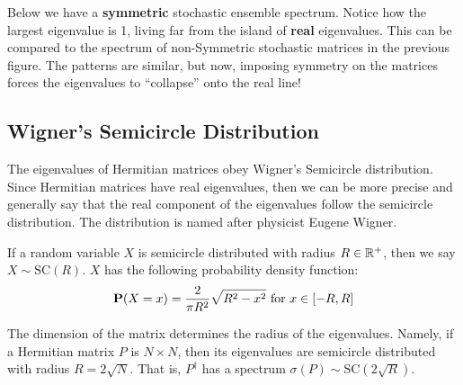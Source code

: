 Below we have a \textbf{symmetric} stochastic ensemble spectrum. Notice how the largest eigenvalue is 1, living far from the island of \textbf{real} eigenvalues. This can be compared to the spectrum of non-Symmetric stochastic matrices in the previous figure. The patterns are similar, but now, imposing symmetry on the matrices forces the eigenvalues to ``collapse'' onto the real line!


\newpage
\subsection{Wigner's Semicircle Distribution}

The eigenvalues of Hermitian matrices obey Wigner's Semicircle distribution. Since Hermitian matrices have real eigenvalues, then we can be more precise and generally say that the real component of the eigenvalues follow the semicircle distribution. The distribution is named after physicist Eugene Wigner.

\begin{definition}
If a random variable $X$ is semicircle distributed with radius $R \in \mathbb{R}^+$, then we say $X \sim \text{SC}(R)$. $X$ has the following probability density function:
$$\textbf{P}(X = x) = \frac{2}{\pi R^2} \sqrt{R^2 - x^2} \text{ for } x \in [-R, R]$$
\end{definition}

\begin{remark}
The dimension of the matrix determines the radius of the eigenvalues. Namely, if a Hermitian matrix $P$ is $N \times N$, then its eigenvalues are semicircle distributed with radius $R = 2\sqrt{N}$. That is, $P^{\dagger}$ has a spectrum $\sigma({P}) \sim \text{SC}(2\sqrt{R})$.
\end{remark}


\newpage
